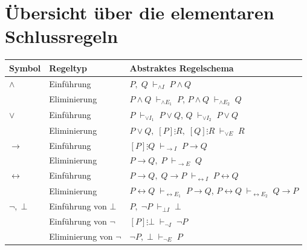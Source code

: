 \documentclass[main.tex]{subfiles}
\begin{document}
\section{Übersicht über die elementaren Schlussregeln}

\begin{center}
  \renewcommand{\arraystretch}{1.3}
  \begin{tabularx}{\textwidth}{@{}l l X@{}}
    \toprule
    Symbol & Regeltyp & Abstraktes Regelschema \\
    \midrule
    $\land$
      & Einführung
      & \label{rule:AI}%
        \(P,\;Q \;\vdash_{\land I}\; P \land Q\) \\[0.6ex]
      & Eliminierung
      & \label{rule:AE1}%
        \(P \land Q \;\vdash_{\land E_1}\; P\),\quad
        \label{rule:AE2}%
        \(P \land Q \;\vdash_{\land E_2}\; Q\) \\[0.9ex]

    $\lor$
      & Einführung
      & \label{rule:OI1}%
        \(P \;\vdash_{\lor I_1}\; P \lor Q\),\quad
        \label{rule:OI2}%
        \(Q \;\vdash_{\lor I_2}\; P \lor Q\) \\[0.6ex]
      & Eliminierung
      & \label{rule:OE}%
        \(P \lor Q,\; [P]\vdots R,\; [Q]\vdots R
          \;\vdash_{\lor E}\; R\) \\[0.9ex]

    $\rightarrow$
      & Einführung
      & \label{rule:RI}%
        \([P]\vdots Q \;\vdash_{\rightarrow I}\; P \rightarrow Q\) \\[0.6ex]
      & Eliminierung
      & \label{rule:RE}%
        \(P \rightarrow Q,\; P \;\vdash_{\rightarrow E}\; Q\) \\[0.9ex]

    $\leftrightarrow$
      & Einführung
      & \label{rule:LRI}%
        \(P \rightarrow Q,\; Q \rightarrow P
          \;\vdash_{\leftrightarrow I}\; P \leftrightarrow Q\) \\[0.6ex]
      & Eliminierung
      & \label{rule:LRE1}%
        \(P \leftrightarrow Q \;\vdash_{\leftrightarrow E_1}\;
          P \rightarrow Q\),\quad
        \label{rule:LRE2}%
        \(P \leftrightarrow Q \;\vdash_{\leftrightarrow E_2}\;
          Q \rightarrow P\) \\[0.9ex]

    $\neg,\;\bot$
      & Einführung von \(\bot\)
      & \label{rule:BI}%
        \(P,\;\neg P \;\vdash_{\bot I}\; \bot\) \\[0.6ex]
      & Einführung von \(\neg\)
      & \label{rule:CI}%
        \([P]\vdots \bot \;\vdash_{\neg I}\; \neg P\) \\[0.6ex]
      & Eliminierung von \(\neg\)
      & \label{rule:CE}%
        \(\neg P,\; \bot \;\vdash_{\neg E}\; P\) \\[0.9ex]


\end{tabularx}
\end{center}
\end{document}

